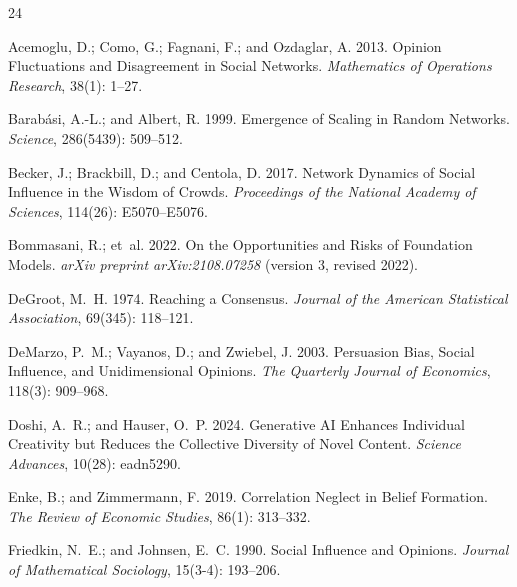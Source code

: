 \documentclass
[letterpaper]{article}
\begin{document}
\begin{thebibliography}{24}
\providecommand{\natexlab}[1]{#1}
\fontsize{8.0pt}{9.0pt}\selectfont
\setlength{\itemsep}{0pt}
\setlength{\parskip}{0pt}

Acemoglu, D.; Como, G.; Fagnani, F.; and Ozdaglar, A. 2013.
\newblock Opinion Fluctuations and Disagreement in Social Networks.
\newblock \emph{Mathematics of Operations Research}, 38(1): 1--27.

Barab{\'a}si, A.-L.; and Albert, R. 1999.
\newblock Emergence of Scaling in Random Networks.
\newblock \emph{Science}, 286(5439): 509--512.

Becker, J.; Brackbill, D.; and Centola, D. 2017.
\newblock Network Dynamics of Social Influence in the Wisdom of Crowds.
\newblock \emph{Proceedings of the National Academy of Sciences}, 114(26): E5070--E5076.

Bommasani, R.; et~al. 2022.
\newblock On the Opportunities and Risks of Foundation Models.
\newblock \emph{arXiv preprint arXiv:2108.07258} (version 3, revised 2022).

DeGroot, M.~H. 1974.
\newblock Reaching a Consensus.
\newblock \emph{Journal of the American Statistical Association}, 69(345): 118--121.

DeMarzo, P.~M.; Vayanos, D.; and Zwiebel, J. 2003.
\newblock Persuasion Bias, Social Influence, and Unidimensional Opinions.
\newblock \emph{The Quarterly Journal of Economics}, 118(3): 909--968.

Doshi, A.~R.; and Hauser, O.~P. 2024.
\newblock Generative AI Enhances Individual Creativity but Reduces the Collective Diversity of Novel Content.
\newblock \emph{Science Advances}, 10(28): eadn5290.

Enke, B.; and Zimmermann, F. 2019.
\newblock Correlation Neglect in Belief Formation.
\newblock \emph{The Review of Economic Studies}, 86(1): 313--332.

Friedkin, N.~E.; and Johnsen, E.~C. 1990.
\newblock Social Influence and Opinions.
\newblock \emph{Journal of Mathematical Sociology}, 15(3-4): 193--206.


\end{thebibliography}
\end{document}
